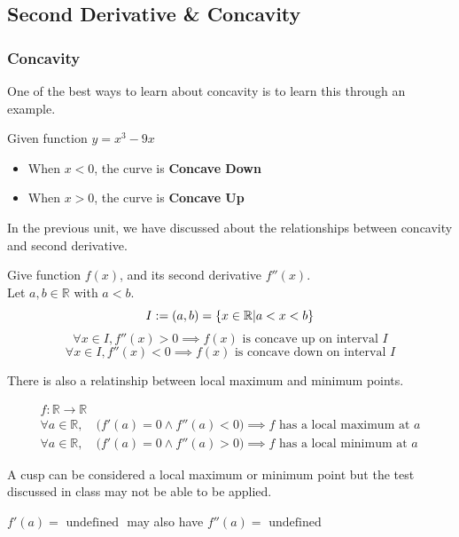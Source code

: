 \subsection{Second Derivative \& Concavity}
\subsubsection{Concavity}
One of the best ways to learn about concavity is to learn this through an example. 

\begin{example}
    Given function $y = x^3 - 9x$
    \begin{center}
    \end{center}

    \begin{itemize}
        \item When $x < 0$, the curve is \textbf{Concave Down}
        \item When $x > 0$, the curve is \textbf{Concave Up}
    \end{itemize}

\end{example}

In the previous unit, we have discussed about the relationships between concavity and second derivative. 
\begin{proposition}
     Give function $f(x)$, and its second derivative $f''(x)$. \\
    Let \(a,b\in\mathbb{R}\) with \(a<b\).
    $$I := (a, b) =  \{ x \in \mathbb{R} | a < x < b\}$$
    \[
        \forall x \in I, f''(x) > 0 \implies \text{\(f(x)\) is concave up on interval $I$}
    \]
    \[
        \forall x \in I, f''(x) < 0 \implies \text{\(f(x)\) is concave down on interval $I$}
    \]
\end{proposition}

There is also a relatinship between local maximum and minimum points. 
\begin{proposition}
    \begin{gather*}
    f:\mathbb{R}\to\mathbb{R} \\
    \forall a\in\mathbb{R},\quad \bigl(f'(a)=0 \land f''(a)<0\bigr)
    \implies f \text{ has a local maximum at } a \\
    \forall a\in\mathbb{R},\quad \bigl(f'(a)=0 \land f''(a)>0\bigr)
    \implies f \text{ has a local minimum at } a
    \end{gather*}
\end{proposition}

\begin{remark}
    A cusp can be considered a local maximum or minimum point but the test discussed in class may not be able to be applied. 

    $f'(a) = \text{ undefined }$ may also have $f''(a) = \text{ undefined}$
 \end{remark}

